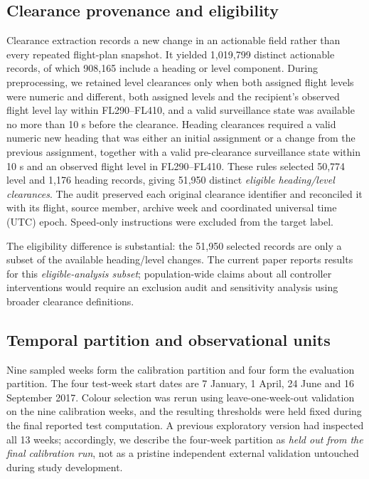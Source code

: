 \documentclass[pdflatex,sn-mathphys-num]{sn-jnl}
\begin{document}
\subsection{Clearance provenance and eligibility}
Clearance extraction records a new change in an actionable field rather than every repeated flight-plan snapshot. It yielded 1,019,799 distinct actionable records, of which 908,165 include a heading or level component. During preprocessing, we retained level clearances only when both assigned flight levels were numeric and different, both assigned levels and the recipient's observed flight level lay within FL290--FL410, and a valid surveillance state was available no more than 10 s before the clearance. Heading clearances required a valid numeric new heading that was either an initial assignment or a change from the previous assignment, together with a valid pre-clearance surveillance state within 10 s and an observed flight level in FL290--FL410. These rules selected 50,774 level and 1,176 heading records, giving 51,950 distinct \emph{eligible heading/level clearances}. The audit preserved each original clearance identifier and reconciled it with its flight, source member, archive week and coordinated universal time (UTC) epoch. Speed-only instructions were excluded from the target label.

The eligibility difference is substantial: the 51,950 selected records are only a subset of the available heading/level changes. The current paper reports results for this \emph{eligible-analysis subset}; population-wide claims about all controller interventions would require an exclusion audit and sensitivity analysis using broader clearance definitions.

\subsection{Temporal partition and observational units}
Nine sampled weeks form the calibration partition and four form the evaluation partition. The four test-week start dates are 7 January, 1 April, 24 June and 16 September 2017. Colour selection was rerun using leave-one-week-out validation on the nine calibration weeks, and the resulting thresholds were held fixed during the final reported test computation. A previous exploratory version had inspected all 13 weeks; accordingly, we describe the four-week partition as \emph{held out from the final calibration run}, not as a pristine independent external validation untouched during study development.
\end{document}
